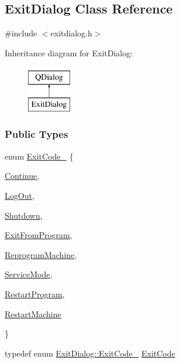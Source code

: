 \hypertarget{classExitDialog}{}\subsection{Exit\+Dialog Class Reference}
\label{classExitDialog}


{\ttfamily \#include $<$exitdialog.\+h$>$}

Inheritance diagram for Exit\+Dialog\+:\begin{figure}[H]
\begin{center}
\leavevmode
\includegraphics[height=2.000000cm]{classExitDialog}
\end{center}
\end{figure}
\subsubsection*{Public Types}
\begin{DoxyCompactItemize}
\item 
enum \mbox{\hyperlink{classExitDialog_ad0d825dce42ecd6e8827f1b6f7167dcb}{Exit\+Code\+\_\+}} \{ \begin{DoxyParamCaption}
\item{ \mbox{\hyperlink{classExitDialog_ad0d825dce42ecd6e8827f1b6f7167dcba518a5489dfa28d18da63778459d52422}{Continue}}, }
\item{ \mbox{\hyperlink{classExitDialog_ad0d825dce42ecd6e8827f1b6f7167dcba0a0f0dc1154f9163e8ce72beea39ff29}{Log\+Out}}, }
\item{ \mbox{\hyperlink{classExitDialog_ad0d825dce42ecd6e8827f1b6f7167dcba2f33cdc04de1ce7953f7aa2abf1be566}{Shutdown}}, }
\item{ \mbox{\hyperlink{classExitDialog_ad0d825dce42ecd6e8827f1b6f7167dcbacd982ca18a78d15196869e96823cd28d}{Exit\+From\+Program}}, }
\item{ \mbox{\hyperlink{classExitDialog_ad0d825dce42ecd6e8827f1b6f7167dcba7be72257e0efaee3c5e707be33bf2399}{Reprogram\+Machine}}, }
\item{ \mbox{\hyperlink{classExitDialog_ad0d825dce42ecd6e8827f1b6f7167dcbae5cc24226e0defe8868759aa87d8c11f}{Service\+Mode}}, }
\item{ \mbox{\hyperlink{classExitDialog_ad0d825dce42ecd6e8827f1b6f7167dcba5232255eabee8632a156274e921ceb69}{Restart\+Program}}, }
\item{ \mbox{\hyperlink{classExitDialog_ad0d825dce42ecd6e8827f1b6f7167dcba6237a611a5ea7749a7f7a6d7b72a1906}{Restart\+Machine}}}
\end{DoxyParamCaption}\}

\item 
typedef enum \mbox{\hyperlink{classExitDialog_ad0d825dce42ecd6e8827f1b6f7167dcb}{Exit\+Dialog\+::\+Exit\+Code\+\_\+}} \mbox{\hyperlink{classExitDialog_a750dfbbef3dec32bec821122ee7b910c}{Exit\+Code}}
\end{DoxyCompactItemize}
